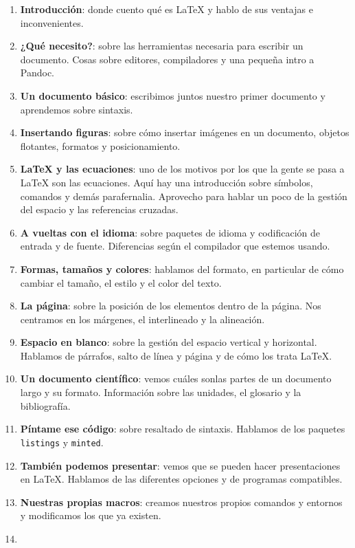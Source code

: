 \begin{enumerate}
\item
  \textbf{Introducción}: donde cuento qué es LaTeX y hablo de sus
  ventajas e inconvenientes.
\item
  \textbf{¿Qué necesito?}: sobre las herramientas necesaria para
  escribir un documento. Cosas sobre editores, compiladores y una
  pequeña intro a Pandoc.
\item
  \textbf{Un documento básico}: escribimos juntos nuestro primer
  documento y aprendemos sobre sintaxis.
\item
  \textbf{Insertando figuras}: sobre cómo insertar imágenes en un
  documento, objetos flotantes, formatos y posicionamiento.
\item
  \textbf{LaTeX y las ecuaciones}: uno de los motivos por los que la
  gente se pasa a LaTeX son las ecuaciones. Aquí hay una introducción
  sobre símbolos, comandos y demás parafernalia. Aprovecho para hablar
  un poco de la gestión del espacio y las referencias cruzadas.
\item
  \textbf{A vueltas con el idioma}: sobre paquetes de idioma y
  codificación de entrada y de fuente. Diferencias según el compilador
  que estemos usando.
\item
  \textbf{Formas, tamaños y colores}: hablamos del formato, en
  particular de cómo cambiar el tamaño, el estilo y el color del texto.
\item
  \textbf{La página}: sobre la posición de los elementos dentro de la
  página. Nos centramos en los márgenes, el interlineado y la
  alineación.
\item
  \textbf{Espacio en blanco}: sobre la gestión del espacio vertical y
  horizontal. Hablamos de párrafos, salto de línea y página y de cómo
  los trata LaTeX.
\item
  \textbf{Un documento científico}: vemos cuáles sonlas partes de un
  documento largo y su formato. Información sobre las unidades, el
  glosario y la bibliografía.
\item
  \textbf{Píntame ese código}: sobre resaltado de sintaxis. Hablamos de
  los paquetes \texttt{listings} y \texttt{minted}.
\item
  \textbf{También podemos presentar}: vemos que se pueden hacer
  presentaciones en LaTeX. Hablamos de las diferentes opciones y de
  programas compatibles.
\item
  \textbf{Nuestras propias macros}: creamos nuestros propios comandos y
  entornos y modificamos los que ya existen.
\item

\end{enumerate}
